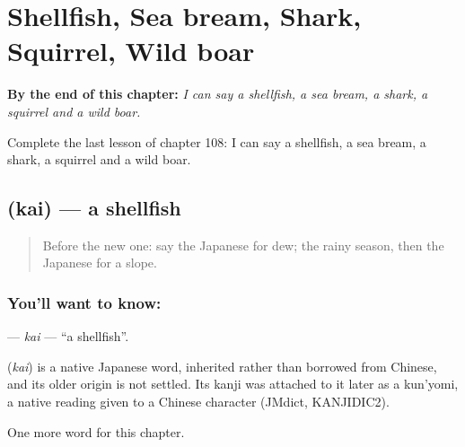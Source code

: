 
\chapter{Shellfish, Sea bream, Shark, Squirrel, Wild boar}
\label{ch:ja-shellfish-sea-bream-shark-squirrel-wild-boar}

\begin{chapteropening}
\textbf{By the end of this chapter:} \emph{I can say a shellfish, a sea bream, a shark, a squirrel and a wild boar.}

Complete the last lesson of chapter 108: I can say a shellfish, a sea bream, a shark, a squirrel and a wild boar.
\end{chapteropening}

\section[\texorpdfstring{\ja{かい} (kai)}{かい (kai)}]{ (kai) — a shellfish}

\label{lesson:JA-C108-kai}



\begin{quote}
Before the new one: say the Japanese for dew; the rainy season, then the Japanese for a slope.
\end{quote}

\subsection*{You'll want to know: }
\textbf{} — \emph{kai} — \textquotedblleft{}a shellfish\textquotedblright{}.

\begin{cousinweb}
\textbf{} (\emph{kai}) is a native Japanese word, inherited rather than borrowed from Chinese, and its older origin is not settled. Its kanji was attached to it later as a kun'yomi, a native reading given to a Chinese character (JMdict, KANJIDIC2).
\end{cousinweb}

\begin{grammarlens}[title={What you've built}]
One more word for this chapter.
\end{grammarlens}

